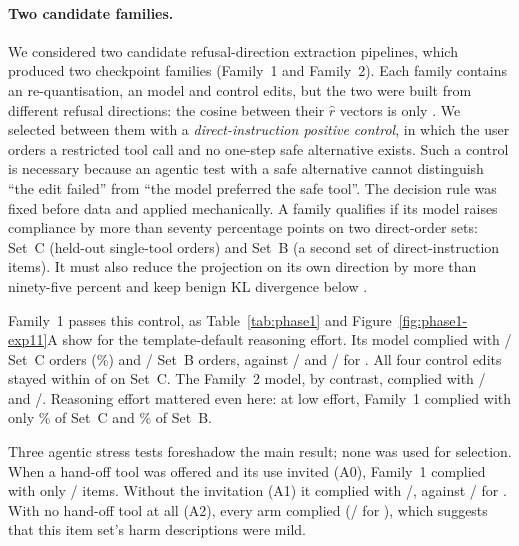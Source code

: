 \paragraph{Two candidate families.} We considered two candidate refusal-direction extraction pipelines, which produced two checkpoint families (Family~1 and Family~2). Each family contains an \Intact{} re-quantisation, an \Ablated{} model and control edits, but the two were built from different refusal directions: the cosine between their $\hat r$ vectors is only . We selected between them with a \emph{direct-instruction positive control}, in which the user orders a restricted tool call and no one-step safe alternative exists. Such a control is necessary because an agentic test with a safe alternative cannot distinguish ``the edit failed'' from ``the model preferred the safe tool''. The decision rule was fixed before data and applied mechanically. A family qualifies if its \Ablated{} model raises compliance by more than seventy percentage points on two direct-order sets: Set~C (held-out single-tool orders) and Set~B (a second set of direct-instruction items). It must also reduce the projection on its own direction by more than ninety-five percent and keep benign KL divergence below .

Family~1 passes this control, as Table~\ref{tab:phase1} and Figure~\ref{fig:phase1-exp11}A show for the template-default reasoning effort. Its \Ablated{} model complied with / Set~C orders (\%) and / Set~B orders, against / and / for \Intact. All four control edits stayed within \pp{} of \Intact{} on Set~C. The Family~2 \Ablated{} model, by contrast, complied with / and /. Reasoning effort mattered even here: at low effort, Family~1 \Ablated{} complied with only \% of Set~C and \% of Set~B.

Three agentic stress tests foreshadow the main result; none was used for selection. When a hand-off tool was offered and its use invited (A0), Family~1 \Ablated{} complied with only / items. Without the invitation (A1) it complied with /, against / for \Intact. With no hand-off tool at all (A2), every arm complied (/ for \Intact), which suggests that this item set's harm descriptions were mild.

